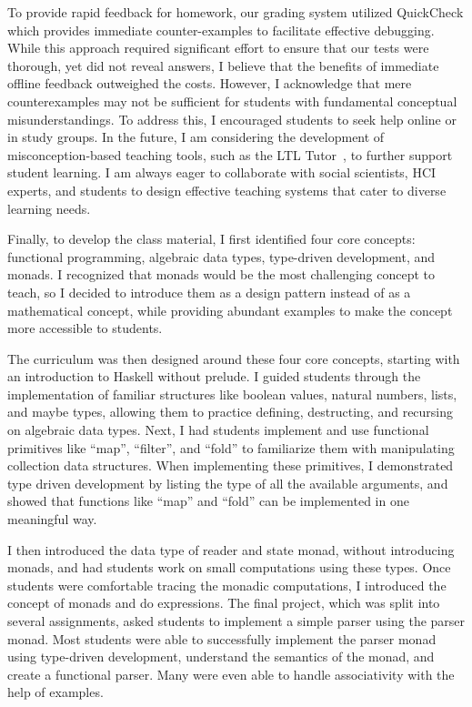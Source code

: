 \documentclass[11pt,a4paper,sans]{moderncv} %
\begin{document}
To provide rapid feedback for homework, our grading system utilized QuickCheck which provides immediate counter-examples to facilitate effective debugging. 
While this approach required significant effort to ensure that our tests were thorough, yet did not reveal answers, I believe that the benefits of immediate offline feedback outweighed the costs. 
However, I acknowledge that mere counterexamples may not be sufficient for students with fundamental conceptual misunderstandings. 
To address this, I encouraged students to seek help online or in study groups. 
In the future, I am considering the development of misconception-based teaching tools, such as the LTL Tutor~\cite{plt_LTLTutor_2024}, to further support student learning. 
I am always eager to collaborate with social scientists, HCI experts, and students to design effective teaching systems that cater to diverse learning needs.

Finally, to develop the class material, I first identified four core concepts: functional programming, algebraic data types, type-driven development, and monads. 
I recognized that monads would be the most challenging concept to teach, so I decided to introduce them as a design pattern instead of as a mathematical concept, while providing abundant examples to make the concept more accessible to students.

The curriculum was then designed around these four core concepts, starting with an introduction to Haskell without prelude. 
I guided students through the implementation of familiar structures like boolean values, natural numbers, lists, and maybe types, allowing them to practice defining, destructing, and recursing on algebraic data types. 
Next, I had students implement and use functional primitives like ``map'', ``filter'', and ``fold'' to familiarize them with manipulating collection data structures.
When implementing these primitives, I demonstrated type driven development by listing the type of all the available arguments, and showed that functions like ``map'' and ``fold'' can be implemented in one meaningful way.

I then introduced the data type of reader and state monad, without introducing monads, and had students work on small computations using these types. 
Once students were comfortable tracing the monadic computations, I introduced the concept of monads and do expressions. 
The final project, which was split into several assignments, asked students to implement a simple parser using the parser monad. 
Most students were able to successfully implement the parser monad using type-driven development, understand the semantics of the monad, and create a functional parser. 
Many were even able to handle associativity with the help of examples.
\end{document}
